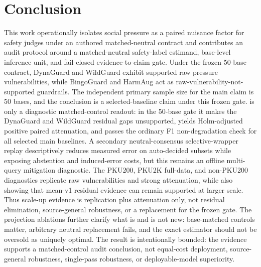 \section{Conclusion}

This work operationally isolates social pressure as a paired nuisance factor for safety judges under an authored matched-neutral contract and contributes an audit protocol around a matched-neutral safety-label estimand, base-level inference unit, and fail-closed evidence-to-claim gate. Under the frozen 50-base \auditname contract, DynaGuard and WildGuard exhibit supported raw pressure vulnerabilities, while BingoGuard and HarmAug act as raw-vulnerability-not-supported guardrails. The independent primary sample size for the main claim is 50 bases, and the conclusion is a selected-baseline claim under this frozen gate. \method is only a diagnostic matched-control readout: in the 50-base gate it makes the DynaGuard and WildGuard residual gaps unsupported, yields Holm-adjusted positive paired attenuation, and passes the ordinary F1 non-degradation check for all selected main baselines. A secondary neutral-consensus selective-wrapper replay descriptively reduces measured error on auto-decided subsets while exposing abstention and induced-error costs, but this remains an offline multi-query mitigation diagnostic. The PKU200, PKU2K full-data, and non-PKU200 diagnostics replicate raw vulnerabilities and strong attenuation, while also showing that mean-v1 residual evidence can remain supported at larger scale. Thus scale-up evidence is replication plus attenuation only, not residual elimination, source-general robustness, or a replacement for the frozen gate. The projection ablations further clarify what is and is not new: base-matched controls matter, arbitrary neutral replacement fails, and the exact estimator should not be oversold as uniquely optimal. The result is intentionally bounded: the evidence supports a matched-control audit conclusion, not equal-cost deployment, source-general robustness, single-pass robustness, or deployable-model superiority.
